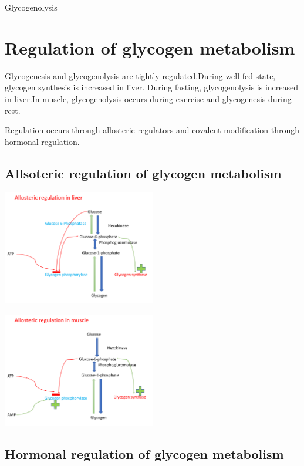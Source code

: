 \documentclass[
]{book}
\begin{document}
Glycogenolysis

\section{Regulation of glycogen metabolism}\label{regulation-of-glycogen-metabolism}

Glycogenesis and glycogenolysis are tightly regulated.During well fed state, glycogen synthesis is increased in liver. During fasting, glycogenolysis is increased in liver.In muscle, glycogenolysis occurs during exercise and glycogenesis during rest.

Regulation occurs through allosteric regulators and covalent modification through hormonal regulation.

\subsection{Allsoteric regulation of glycogen metabolism}\label{allsoteric-regulation-of-glycogen-metabolism}

\includegraphics[width=0.5\textwidth,height=\textheight]{Images/Gly_allo_liver.png}

\includegraphics[width=0.5\textwidth,height=\textheight]{Images/Gly_allo_muscle.png}

\subsection{Hormonal regulation of glycogen metabolism}\label{hormonal-regulation-of-glycogen-metabolism}
\end{document}
